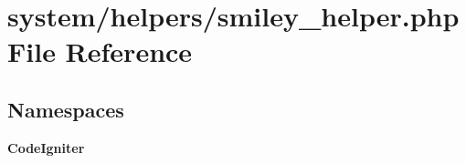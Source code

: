 \section{system/helpers/smiley\-\_\-helper.php File Reference}
\label{smiley__helper_8php}
\subsection*{Namespaces}
\begin{DoxyCompactItemize}
\item 
{\bf Code\-Igniter}
\end{DoxyCompactItemize}
